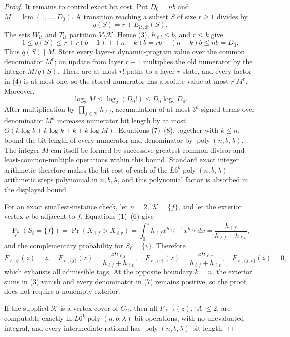 \documentclass{article}
\begin{document}
\begin{proof}
It remains to control exact bit cost.  Put \(D_0=nb\) and \(M=\operatorname{lcm}(1,\ldots,D_0)\).  A transition reaching a subset \(S\) of size \(r\geq1\) divides by
\[
 q(S)=r+E_{\mathcal U,\mathcal B}(S).
\]
The sets \(W_{\mathcal U}\) and \(T_{\mathcal U}\) partition \(V\setminus\mathcal K\).  Hence (3), \(h_{\ell i}\leq b\), and \(r\leq k\) give
\[
 1\leq q(S)
 \leq r+r(b-1)+(n-k)b
 =rb+(n-k)b
 \leq nb=D_0.                                                                 \tag{7}
\]
Thus \(q(S)\mid M\).  Store every layer-\(r\) dynamic-program value over the common denominator \(M^r\); an update from layer \(r-1\) multiplies the old numerator by the integer \(M/q(S)\).  There are at most \(r!\) paths to a layer-\(r\) state, and every factor in (4) is at most one, so the stored numerator has absolute value at most \(r!M^r\).  Moreover,
\[
 \log_2 M\leq\log_2(D_0!)\leq D_0\log_2 D_0.                                 \tag{8}
\]
After multiplication by \(\prod_{f\in\mathcal K}h_{\ell f}\), accumulation of at most \(3^k\) signed terms over denominator \(M^k\) increases numerator bit length by at most \(O(k\log b+k\log k+k+k\log M)\).  Equations (7)--(8), together with \(k\leq n\), bound the bit length of every numerator and denominator by \(\operatorname{poly}(n,b,\lambda)\).  The integer \(M\) can itself be formed by successive greatest-common-divisor and least-common-multiple operations within this bound.  Standard exact integer arithmetic therefore makes the bit cost of each of the \(L6^k\operatorname{poly}(n,b,\lambda)\) arithmetic steps polynomial in \(n,b,\lambda\), and this polynomial factor is absorbed in the displayed bound.

For an exact smallest-instance check, let \(n=2\), \(\mathcal K=\{f\}\), and let the exterior vertex \(v\) be adjacent to \(f\).  Equations (1)--(6) give
\[
 \Pr_{\ell}(S_{\ell}=\{f\})
 =\Pr(X_{\ell f}>X_{\ell v})
 =\int_0^1h_{\ell f}x^{h_{\ell f}-1}x^{h_{\ell v}}\,dx
 =\frac{h_{\ell f}}{h_{\ell f}+h_{\ell v}},
\]
and the complementary probability for \(S_{\ell}=\{v\}\).  Therefore
\[
 F_{\ell,\varnothing}(z)=z,
 \quad
 F_{\ell,\{f\}}(z)=\frac{zh_{\ell f}}{h_{\ell f}+h_{\ell v}},
 \quad
 F_{\ell,\{v\}}(z)=\frac{zh_{\ell v}}{h_{\ell f}+h_{\ell v}},
 \quad
 F_{\ell,\{f,v\}}(z)=0,
\]
which exhausts all admissible tags.  At the opposite boundary \(k=n\), the exterior sums in (3) vanish and every denominator in (7) remains positive, so the proof does not require a nonempty exterior.

If the supplied \(\mathcal K\) is a vertex cover of \(C_G\), then all \(F_{\ell,A}(z)\), \(|A|\le2\), are computable exactly in \(L6^k\operatorname{poly}(n,b,\lambda)\) bit operations, with no unevaluated integral, and every intermediate rational has \(\operatorname{poly}(n,b,\lambda)\) bit length.
\end{proof}
\end{document}
